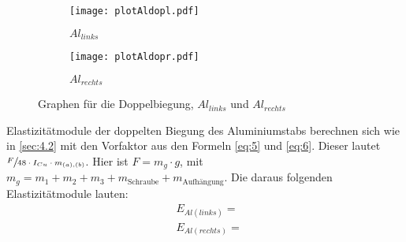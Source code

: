 \begin{figure}[H]
\begin{subfigure}{0.495\linewidth}
    \centering
    \texttt{[image: plotAldopl.pdf]}
    \caption{$Al_{links}$\label{fig:4a}}
\end{subfigure}
\begin{subfigure}{0.495\linewidth}
    \centering
    \texttt{[image: plotAldopr.pdf]}
    \caption{$Al_{rechts}$\label{fig:4b}}    
\end{subfigure}
\caption{Graphen für die Doppelbiegung, $Al_{links}$ und $Al_{rechts}$\label{fig:4}}
\end{figure}

\justifying Elastizitätmodule der doppelten Biegung des Aluminiumstabs berechnen sich wie in \ref{sec:4.2} mit den Vorfaktor
aus den Formeln \eqref{eq:5} und \eqref{eq:6}. Dieser lautet $\sfrac{F}{48 \cdot I_{Cu} \cdot m_{(a),(b)}}$. Hier ist $F = m_g\cdot g$, mit 
$m_g = m_1 + m_2 + m_3 + m_{\text{Schraube}} + m_{\text{Aufhängung}}$. Die daraus folgenden Elastizitätmodule lauten:
\begin{align}
    &E_{Al(links)} = \text{} \label{eq:28}\\
    &E_{Al(rechts)} = \text{} \label{eq:28}
\end{align}



